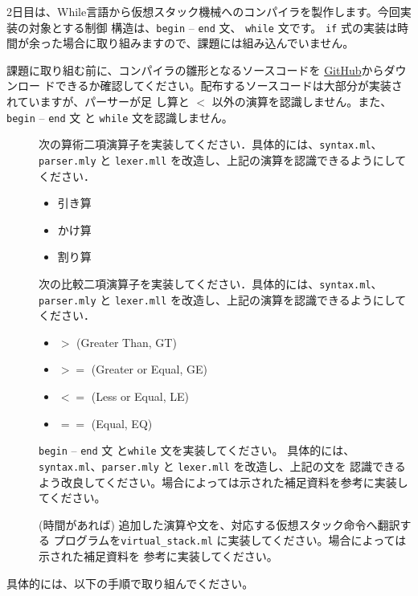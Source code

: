 \documentclass[a4paper,11pt]{jsarticle}
\begin{document}
2日目は、While言語から仮想スタック機械へのコンパイラを製作します。今回実装の対象とする制御
構造は、\verb|begin| -- \verb|end| 文、 \verb|while| 文です。
\verb|if| 式の実装は時間が余った場合に取り組みますので、課題には組み込んでいません。

課題に取り組む前に、コンパイラの雛形となるソースコードを
\href{https://github.com/tmu-compiler-info-sys-exp-I/compiler-day2}{GitHub}からダウンロー
ドできるか確認してください。配布するソースコードは大部分が実装されていますが、パーサーが足
し算と $<$ 以外の演算を認識しません。また、
\verb|begin| -- \verb|end| 文 と \verb|while| 文を認識しません。

\begin{description}
\item [] 次の算術二項演算子を実装してください．具体的には、\verb|syntax.ml|、
  \verb|parser.mly| と \verb|lexer.mll| を改造し、上記の演算を認識できるようにしてください．
  \begin{itemize}
  \item 引き算
  \item かけ算
  \item 割り算
  \end{itemize}
\item [] 次の比較二項演算子を実装してください．具体的には、\verb|syntax.ml|、
  \verb|parser.mly| と \verb|lexer.mll| を改造し、上記の演算を認識できるようにしてください．
  \begin{itemize}
  \item $>$ (Greater Than, GT)
  \item $>=$ (Greater or Equal, GE)
  \item $<=$ (Less or Equal, LE)
  \item $==$ (Equal, EQ)
  \end{itemize}
\item [] \verb|begin| -- \verb|end| 文 と\verb|while| 文を実装してください。
  具体的には、\verb|syntax.ml|、\verb|parser.mly| と \verb|lexer.mll| を改造し、上記の文を
  認識できるよう改良してください。場合によっては示された補足資料を参考に実装してください。
\item [] (時間があれば) 追加した演算や文を、対応する仮想スタック命令へ翻訳する
  プログラムを\verb|virtual_stack.ml| に実装してください。場合によっては示された補足資料を
  参考に実装してください。
\end{description}

具体的には、以下の手順で取り組んでください。

\noindent{}
\end{document}
